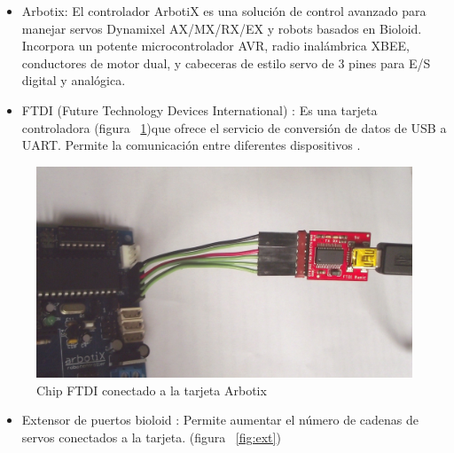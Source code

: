 \begin{itemize}
\item Arbotix: El controlador ArbotiX es una solución de control avanzado para manejar servos Dynamixel AX/MX/RX/EX y robots
basados en Bioloid. Incorpora un potente microcontrolador AVR, radio inalámbrica XBEE, conductores de motor dual, y cabeceras
de estilo servo de 3 pines para E/S digital y analógica.\cite{arbotix}

\end{itemize}


\begin{itemize}
\item FTDI (Future Technology Devices International) : Es una tarjeta controladora  (figura ~\ref{fig:ftdi})que ofrece el servicio de conversión de  datos de USB a UART. Permite la comunicación entre diferentes dispositivos \cite{ftdi}.

\end{itemize}

\begin{figure}[hbtp]
\centering
\label{fig:ftdi}
\includegraphics[scale=0.06]{imagenes/DSCF1162.jpg}
\caption{Chip FTDI conectado a la tarjeta Arbotix}
\end{figure}

\begin{itemize}
\item Extensor de puertos bioloid : Permite aumentar el número de cadenas de servos conectados a la tarjeta. (figura ~\ref{fig:ext}) \cite{hub} 
\end{itemize}

